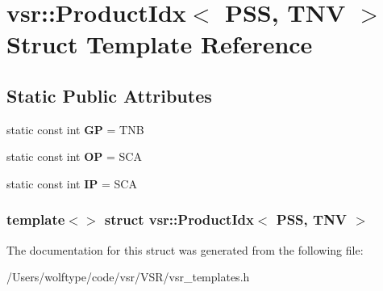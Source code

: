 \hypertarget{structvsr_1_1_product_idx_3_01_p_s_s_00_01_t_n_v_01_4}{\section{vsr\-:\-:Product\-Idx$<$ P\-S\-S, T\-N\-V $>$ Struct Template Reference}
\label{structvsr_1_1_product_idx_3_01_p_s_s_00_01_t_n_v_01_4}
}
\subsection*{Static Public Attributes}
\begin{DoxyCompactItemize}
\item 
\hypertarget{structvsr_1_1_product_idx_3_01_p_s_s_00_01_t_n_v_01_4_ae5ef909bb7dd4e1f9b8d1ed1fbed8ce9}{static const int {\bfseries G\-P} = T\-N\-B}\label{structvsr_1_1_product_idx_3_01_p_s_s_00_01_t_n_v_01_4_ae5ef909bb7dd4e1f9b8d1ed1fbed8ce9}

\item 
\hypertarget{structvsr_1_1_product_idx_3_01_p_s_s_00_01_t_n_v_01_4_a921f384bc70feb8f1d4355ad041c69b7}{static const int {\bfseries O\-P} = S\-C\-A}\label{structvsr_1_1_product_idx_3_01_p_s_s_00_01_t_n_v_01_4_a921f384bc70feb8f1d4355ad041c69b7}

\item 
\hypertarget{structvsr_1_1_product_idx_3_01_p_s_s_00_01_t_n_v_01_4_acb41865da62fa30952b447f08f4cb540}{static const int {\bfseries I\-P} = S\-C\-A}\label{structvsr_1_1_product_idx_3_01_p_s_s_00_01_t_n_v_01_4_acb41865da62fa30952b447f08f4cb540}

\end{DoxyCompactItemize}
\subsubsection*{template$<$$>$ struct vsr\-::\-Product\-Idx$<$ P\-S\-S, T\-N\-V $>$}



The documentation for this struct was generated from the following file\-:\begin{DoxyCompactItemize}
\item 
/\-Users/wolftype/code/vsr/\-V\-S\-R/vsr\-\_\-templates.\-h\end{DoxyCompactItemize}
